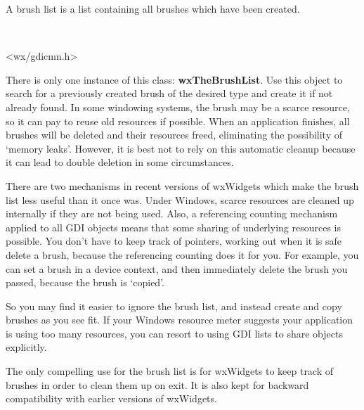 A brush list is a list containing all brushes which have been created.


\\


<wx/gdicmn.h>


There is only one instance of this class: {\bf wxTheBrushList}.  Use
this object to search for a previously created brush of the desired
type and create it if not already found. In some windowing systems,
the brush may be a scarce resource, so it can pay to reuse old
resources if possible. When an application finishes, all brushes will
be deleted and their resources freed, eliminating the possibility of
`memory leaks'. However, it is best not to rely on this automatic
cleanup because it can lead to double deletion in some circumstances.

There are two mechanisms in recent versions of wxWidgets which make the
brush list less useful than it once was. Under Windows, scarce resources
are cleaned up internally if they are not being used. Also, a referencing
counting mechanism applied to all GDI objects means that some sharing
of underlying resources is possible. You don't have to keep track of pointers,
working out when it is safe delete a brush, because the referencing counting does
it for you. For example, you can set a brush in a device context, and then
immediately delete the brush you passed, because the brush is `copied'.

So you may find it easier to ignore the brush list, and instead create
and copy brushes as you see fit. If your Windows resource meter suggests
your application is using too many resources, you can resort to using
GDI lists to share objects explicitly.

The only compelling use for the brush list is for wxWidgets to keep
track of brushes in order to clean them up on exit. It is also kept for
backward compatibility with earlier versions of wxWidgets.




\label{wxbrushlistconstr}


